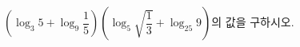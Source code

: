 $\left(\log_3 5+\log_9 \dfrac{1}{5}\right)\left(\log_5 \sqrt{\dfrac{1}{3}}+\log_{25} 9\right)$의 값을 구하시오.
